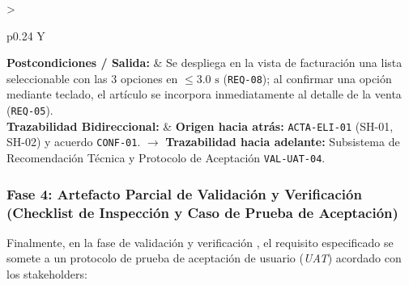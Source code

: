 \begin{table}[htbp]
\begin{tabularx}{\textwidth}{>{\raggedright\arraybackslash}p{} Y}
		\textbf{Postcondiciones / Salida:} & Se despliega en la vista de facturación una lista seleccionable con las 3 opciones en $\le 3.0\text{ s}$ (\texttt{REQ-08}); al confirmar una opción mediante teclado, el artículo se incorpora inmediatamente al detalle de la venta (\texttt{REQ-05}). \\
		\textbf{Trazabilidad Bidireccional:} & \textbf{Origen hacia atrás:} \texttt{ACTA-ELI-01} (SH-01, SH-02) y acuerdo \texttt{CONF-01}. $\rightarrow$ \textbf{Trazabilidad hacia adelante:} Subsistema de Recomendación Técnica y Protocolo de Aceptación \texttt{VAL-UAT-04}. \\
		\bottomrule
	\end{tabularx}
\end{table}
\subsubsection{Fase 4: Artefacto Parcial de Validación y Verificación (Checklist de Inspección y Caso de Prueba de Aceptación)}
Finalmente, en la fase de validación y verificación \cite{ieee29148, pohl2025}, el requisito especificado se somete a un protocolo de prueba de aceptación de usuario (\textit{UAT}) acordado con los stakeholders:
